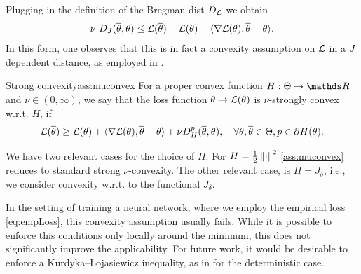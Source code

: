 %
Plugging in the definition of the Bregman dist $D_{\mathcal{L}}$ we obtain
%
\begin{align*}
\nu\ D_J(\overline\theta,\theta) \leq \mathcal{L}(\overline\theta) - \mathcal{L}(\theta) - 
\langle \nabla\mathcal{L}(\theta), \overline\theta-\theta\rangle.
\end{align*}
%
In this form, one observes that this is in fact a convexity assumption on $\mathcal{L}$ in a $J$ dependent distance, as employed in \cite{bungert2022bregman}.
%
%
\begin{assumption}{Strong convexity}{ass:muconvex} 
For a proper convex function $H:\Param\to\R$ and $\nu\in(0,\infty)$, we say that the loss function $\theta\mapsto\mathcal{L}(\theta)$ is $\nu$-strongly convex w.r.t. $H$, if
\begin{align}
\mathcal{L}(\overline\theta) \geq \mathcal{L}(\theta) + \langle\nabla\mathcal{L}(\theta), \overline\theta - \theta\rangle + \nu D_H^p(\overline\theta,\theta),\quad\forall\theta,\overline\theta\in\Theta, p\in\partial H(\theta).
\end{align}
\end{assumption}
%
%
\begin{remark}{}{}
We have two relevant cases for the choice of $H$. For $H=\frac{1}{2}\left\|\cdot\right\|^2$ \cref{ass:muconvex} reduces to standard strong $\nu$-convexity. The other relevant case, is $H=J_\delta$, i.e., we consider convexity w.r.t. to the functional $J_\delta$.
\end{remark}
%
%
\begin{remark}{}{}
In the setting of training a neural network, where we employ the empirical loss \cref{eq:empLoss}, this convexity assumption usually fails. While it is possible to enforce this conditions only locally around the minimum, this does not significantly improve the applicability. For future work, it would be desirable to enforce a  Kurdyka--\L ojasiewicz inequality, as in \cite{benning2018choose} for the deterministic case. 
\end{remark}

